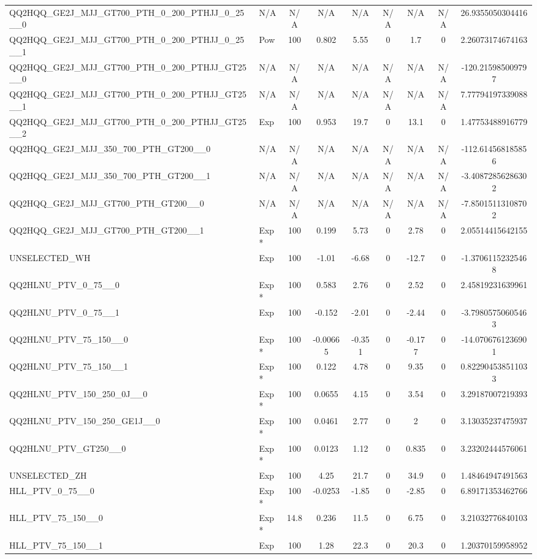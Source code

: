\begin{table}[!h]
{\begin{tabular}{llccccccS[table-format = 3.2, round-mode = places, round-precision = 2]}
 QQ2HQQ\_GE2J\_MJJ\_GT700\_PTH\_0\_200\_PTHJJ\_0\_25\_\_0 &N/A&N/A&N/A&N/A&N/A&N/A&N/A&26.9355050304416\\
 QQ2HQQ\_GE2J\_MJJ\_GT700\_PTH\_0\_200\_PTHJJ\_0\_25\_\_1 & Pow &100&0.802&5.55&0&1.7&0&2.26073174674163\\
 QQ2HQQ\_GE2J\_MJJ\_GT700\_PTH\_0\_200\_PTHJJ\_GT25\_\_0 &N/A&N/A&N/A&N/A&N/A&N/A&N/A&-120.215985009797\\
 QQ2HQQ\_GE2J\_MJJ\_GT700\_PTH\_0\_200\_PTHJJ\_GT25\_\_1 &N/A&N/A&N/A&N/A&N/A&N/A&N/A&7.77794197339088\\
 QQ2HQQ\_GE2J\_MJJ\_GT700\_PTH\_0\_200\_PTHJJ\_GT25\_\_2 & Exp &100&0.953&19.7&0&13.1&0&1.47753488916779\\
 QQ2HQQ\_GE2J\_MJJ\_350\_700\_PTH\_GT200\_\_0 &N/A&N/A&N/A&N/A&N/A&N/A&N/A&-112.614568185856\\
 QQ2HQQ\_GE2J\_MJJ\_350\_700\_PTH\_GT200\_\_1 &N/A&N/A&N/A&N/A&N/A&N/A&N/A&-3.40872856286302\\
 QQ2HQQ\_GE2J\_MJJ\_GT700\_PTH\_GT200\_\_0 &N/A&N/A&N/A&N/A&N/A&N/A&N/A&-7.85015113108702\\
 QQ2HQQ\_GE2J\_MJJ\_GT700\_PTH\_GT200\_\_1 & Exp* &100&0.199&5.73&0&2.78&0&2.05514415642155\\
 UNSELECTED\_WH & Exp &100&-1.01&-6.68&0&-12.7&0&-1.37061152325468\\
 QQ2HLNU\_PTV\_0\_75\_\_0 & Exp* &100&0.583&2.76&0&2.52&0&2.45819231639961\\
 QQ2HLNU\_PTV\_0\_75\_\_1 & Exp &100&-0.152&-2.01&0&-2.44&0&-3.79805750605463\\
 QQ2HLNU\_PTV\_75\_150\_\_0 & Exp* &100&-0.00665&-0.351&0&-0.177&0&-14.0706761236901\\
 QQ2HLNU\_PTV\_75\_150\_\_1 & Exp* &100&0.122&4.78&0&9.35&0&0.822904538511033\\
 QQ2HLNU\_PTV\_150\_250\_0J\_\_0 & Exp* &100&0.0655&4.15&0&3.54&0&3.29187007219393\\
 QQ2HLNU\_PTV\_150\_250\_GE1J\_\_0 & Exp* &100&0.0461&2.77&0&2&0&3.13035237475937\\
 QQ2HLNU\_PTV\_GT250\_\_0 & Exp* &100&0.0123&1.12&0&0.835&0&3.23202444576061\\
 UNSELECTED\_ZH & Exp &100&4.25&21.7&0&34.9&0&1.48464947491563\\
 HLL\_PTV\_0\_75\_\_0 & Exp* &100&-0.0253&-1.85&0&-2.85&0&6.89171353462766\\
 HLL\_PTV\_75\_150\_\_0 & Exp* &14.8&0.236&11.5&0&6.75&0&3.21032776840103\\
 HLL\_PTV\_75\_150\_\_1 & Exp &100&1.28&22.3&0&20.3&0&1.20370159958952\\

\end{tabular}}
\end{table}
